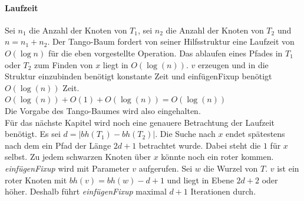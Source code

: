 \documentclass[a4paper,12pt]{article}
\begin{document}
\paragraph{Laufzeit}
Sei $n_1$ die Anzahl der Knoten von $T_1$, sei $n_2$ die Anzahl der Knoten von $T_2$ und $n = n_1 + n_2$. Der Tango-Baum fordert von seiner Hilfsstruktur eine Laufzeit von $O(\log n)$ für die eben vorgestellte Operation.  Das ablaufen eines Pfades in $T_1$ oder $T_2$ zum Finden von $x$ liegt in $O(\log (n))$. $v$ erzeugen und in die Struktur einzubinden benötigt konstante Zeit und einfügenFixup benötigt  $O(\log (n))$ Zeit.\\
$O(\log (n)) + O(1) +O(\log (n)) = O(\log (n
))$\\
Die Vorgabe des Tango-Baumes wird also eingehalten.\\
Für das nächste Kapitel wird noch eine genauere Betrachtung der Laufzeit benötigt. Es sei $d = \vert \mathit{bh}(T_1) - \mathit{bh}(T_2)  \vert $. Die Suche nach $x$ endet spätestens nach dem ein Pfad der Länge $2d + 1$ betrachtet wurde. Dabei steht die $1$ für $x$ selbst. Zu jedem schwarzen Knoten über $x$ könnte noch ein roter kommen.\\
\textit{einfügenFixup} wird mit Parameter $v$ aufgerufen. Sei $w$ die Wurzel von $T$. $v$ ist ein roter Knoten mit $\mathit{bh}(v) = \mathit{bh}(w) - d + 1$ und liegt in Ebene $2d + 2$ oder höher. Deshalb führt \textit{einfügenFixup} maximal $d + 1$ Iterationen durch.  
\end{document}
